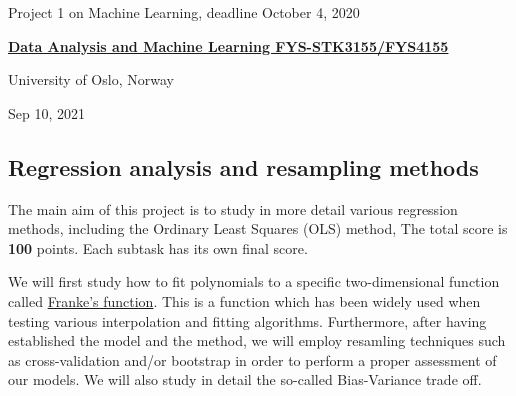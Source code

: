 \documentclass[%
oneside,                 %
final,                   %
10pt]{article}
\begin{document}

\newcommand{\exercisesection}[1]{\subsection*{#1}}






\thispagestyle{empty}

\begin{center}
{\LARGE\bf
\begin{spacing}{1.25}
Project 1 on Machine Learning, deadline October 4, 2020
\end{spacing}
}
\end{center}


\begin{center}
{\bf \href{{http://www.uio.no/studier/emner/matnat/fys/FYS3155/index-eng.html}}{Data Analysis and Machine Learning FYS-STK3155/FYS4155}}
\end{center}

    \begin{center}
\centerline{{\small University of Oslo, Norway}}
\end{center}
    

\begin{center}
Sep 10, 2021
\end{center}

\vspace{1cm}


\subsection*{Regression analysis and resampling methods}

The main aim of this project is to study in more detail various
regression methods, including the Ordinary Least Squares (OLS) method,
The total score is \textbf{100} points. Each subtask has its own final score.


We will first study how to fit polynomials to a specific
two-dimensional function called \href{{http://www.dtic.mil/dtic/tr/fulltext/u2/a081688.pdf}}{Franke's
function}.  This
is a function which has been widely used when testing various
interpolation and fitting algorithms. Furthermore, after having
established the model and the method, we will employ resamling
techniques such as cross-validation and/or bootstrap in order to perform a
proper assessment of our models. We will also study in detail the
so-called Bias-Variance trade off.
\end{document}
